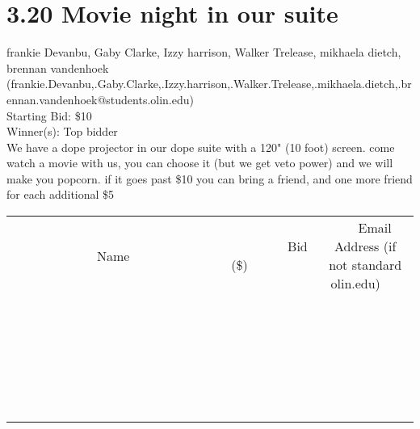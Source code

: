 \documentclass[11pt]{article}
\begin{document}
\section*{3.20 Movie night in our suite}
frankie Devanbu, Gaby Clarke, Izzy harrison, Walker Trelease, mikhaela dietch, brennan vandenhoek (frankie.Devanbu,.Gaby.Clarke,.Izzy.harrison,.Walker.Trelease,.mikhaela.dietch,.brennan.vandenhoek@students.olin.edu) \\
Starting Bid: \$10 \\
Winner(s): 
Top bidder \\
We have a dope projector in our dope suite with a 120" (10 foot) screen. come watch a movie with us, you can choose it (but we get veto power) and we will make you popcorn. if it goes past \$10 you can bring a friend, and one more friend for each additional \$5 \\[6ex]
\begin{tabular}{c c c}
~~~~~~~~~~~~~Name~~~~~~~~~~~~~ & ~~~~~~~~~Bid (\$)~~~~~~~~~ & ~~~Email Address (if not standard olin.edu)~~~ \\
 & & \\
\hline
 & & \\
\hline
 & & \\
\hline
 & & \\
\hline
 & & \\
\hline
 & & \\
\hline
 & & \\
\hline
 & & \\
\hline
 & & \\
\hline
 & & \\
\hline
 & & \\
\hline
 & & \\
\hline
 & & \\
\hline
 & & \\
\hline
 & & \\
\hline
 & & \\
\hline
 & & \\
\hline
 & & \\
\hline
 & & \\
\hline
 & & \\
\hline
 & & \\
\hline
 & & \\
\hline
 & & \\
\hline
 & & \\
\hline
 & & \\
\hline
 & & \\
\hline
\end{tabular}
\clearpage
\end{document}
